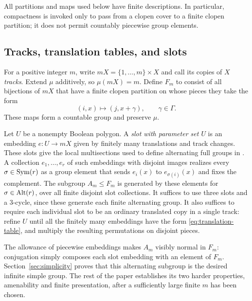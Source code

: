 All partitions and maps used below have finite descriptions. In
particular, compactness is invoked only to pass from a clopen cover
to a finite clopen partition; it does not permit countably piecewise
group elements.

\subsection{Tracks, translation tables, and slots}

For a positive integer $m$, write $mX=\{1,\ldots,m\}\times X$ and
call its copies of $X$ \emph{tracks}. Extend $\mu$ additively, so
$\mu(mX)=m$. Define $F_m$ to consist of all bijections of $mX$ that
have a finite clopen partition on whose pieces they take the form
\begin{equation}\label{eq:translation-table}
 (i,x)\longmapsto(j,x+\gamma),\qquad \gamma\in\Gamma.
\end{equation}
These maps form a countable group and preserve $\mu$.

Let $U$ be a nonempty Boolean polygon. A \emph{slot with parameter
set $U$} is an embedding $e:U\longrightarrow mX$ given by finitely
many translations and track changes. These slots give the local multisections used to define alternating
full groups in \cite[Section~3]{Nekrashevych2019}.  A collection
$e_1,\ldots,e_r$ of such embeddings with disjoint images realizes
every $\sigma\in\operatorname{Sym}(r)$ as a group element that sends
$e_i(x)$ to $e_{\sigma(i)}(x)$ and fixes the complement. The subgroup
$A_m\le F_m$ is generated by these elements for
$\sigma\in\operatorname{Alt}(r)$, over all finite disjoint slot collections.
It suffices to use three slots and a $3$-cycle, since these generate
each finite alternating group. It also suffices to require each
individual slot to be an ordinary translated copy in a single track:
refine $U$ until all the finitely many embeddings have the form
\eqref{eq:translation-table}, and multiply the resulting permutations
on disjoint pieces.

The allowance of piecewise embeddings makes $A_m$ visibly normal in
$F_m$: conjugation simply composes each slot embedding with an
element of $F_m$. Section~\ref{sec:simplicity} proves that this
alternating subgroup is the desired infinite simple group. The rest
of the paper establishes its two harder properties, amenability and
finite presentation, after a sufficiently large finite $m$ has been
chosen.
